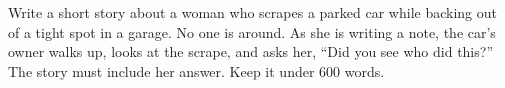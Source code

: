 Write a short story about a woman who scrapes a parked car while backing out of a tight spot in a garage. No one is around. As she is writing a note, the car's owner walks up, looks at the scrape, and asks her, ``Did you see who did this?'' The story must include her answer. Keep it under 600 words.

